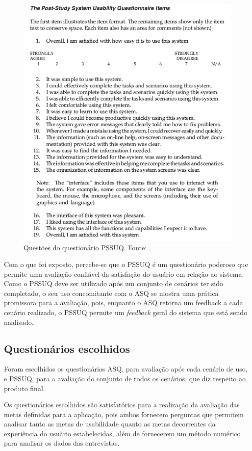      \vfill
      \pagebreak
      \begin{figure}[!htpb]
	\centering
	\includegraphics[scale=0.7]{editaveis/figuras/pssuq_questions}
	\caption[Questões do questionário PSSUQ]{Questões do questionário PSSUQ. Fonte: \cite{lewis02}.}
	\label{pssuq_questions}
      \end{figure}
      
      Com o que foi exposto, percebe-se que o PSSUQ é um questionário poderoso que permite uma avaliação confiável da
      satisfação do usuário em relação ao sistema. Como o PSSUQ deve ser utilizado após um conjunto de cenários ter sido
      completado, o seu uso concomitante com o ASQ se mostra uma prática promissora para a avaliação, pois, enquanto o ASQ
      retorna um feedback a cada cenário realizado, o PSSUQ permite um \textit{feedback} geral do sistema que está sendo analisado.
      
      \vfill
      
    \subsection{Questionários escolhidos}

      Foram escolhidos os questionários ASQ, para avaliação após cada cenário de uso, e PSSUQ, para a avaliação
      do conjunto de todos os cenários, que diz respeito ao produto final. 
      
      Os questionários escolhidos são satisfatórios para a realização
      da avaliação das metas definidas para a aplicação, pois ambos fornecem perguntas que permitem analisar tanto as metas 
      de usabilidade quanto as metas decorrentes da experiência do usuário estabelecidas, além de fornecerem um método numérico para 
      analisar os dados das entrevistas.
      
